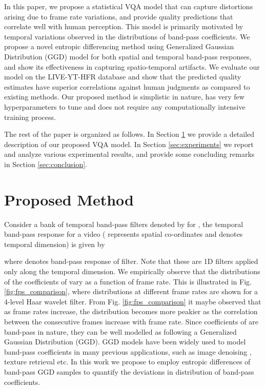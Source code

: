 \documentclass[journal]{IEEEtran}
\begin{document}
In this paper, we propose a statistical VQA model that can capture distortions arising due to frame rate variations, and provide quality predictions that correlate well with human perception. This model is primarily motivated by temporal variations observed in the distributions of band-pass coefficients. We propose a novel entropic differencing method using Generalized Gaussian Distribution (GGD) model for both spatial and temporal band-pass responses, and show its effectiveness in capturing spatio-temporal artifacts. We evaluate our model on the LIVE-YT-HFR database and show that the predicted quality estimates have superior correlations against human judgments as compared to existing methods. Our proposed method is simplistic in nature, has very few hyperparameters to tune and does not require any computationally intensive training process. 

The rest of the paper is organized as follows. In Section \ref{sec:Objective_QA} we provide a detailed description of our proposed VQA model. In Section \ref{sec:experiments} we report and analyze various experimental results, and provide some concluding remarks in Section \ref{sec:conclusion}.

\section{Proposed Method}
\label{sec:Objective_QA}

Consider a bank of  temporal band-pass filters denoted by  for , the temporal band-pass response for a video  ( represents spatial co-ordinates and  denotes temporal dimension) is given by

where  denotes band-pass response of  filter. Note that these are 1D filters applied only along the temporal dimension. We empirically observe that the distributions of the coefficients of  vary as a function of frame rate. This is illustrated in Fig. \ref{fig:fps_comparison}, where distributions at different frame rates are shown for a 4-level Haar wavelet filter. From Fig. \ref{fig:fps_comparison} it maybe observed that as frame rates increase, the distribution becomes more peakier as the correlation between the consecutive frames increase with frame rate. Since coefficients of  are band-pass in nature, they can be well modelled as following a Generalized Gaussian Distribution (GGD). GGD models have been widely used to model band-pass coefficients in many previous applications, such as image denoising \cite{chang2000adaptive}, texture retrieval \cite{do2002wavelet} etc. In this work we propose to employ entropic differences of band-pass GGD samples to quantify the deviations in distribution of band-pass coefficients. 
\end{document}
